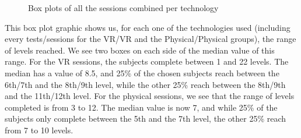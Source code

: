 \documentclass[12pt, openany, twocolumn]{article}
\begin{document}
                \begin{figure}[H]
                    \setlength{\fboxsep}{0pt}
                    \setlength{\fboxrule}{1pt}
                    \caption{Box plots of all the sessions combined per technology}
                \end{figure}

            This box plot graphic shows us, for each one of the technologies used (including every tests/sessions for the VR/VR and the Physical/Physical groups), the range of levels reached. We see two boxes on each side of the median value of this range.
            For the VR sessions, the subjects complete between 1 and 22 levels. The median has a value of 8.5, and 25\% of the chosen subjects reach between the 6th/7th and the 8th/9th level, while the other 25\% reach between the 8th/9th and the 11th/12th level.
            For the physical sessions, we see that the range of levels completed is from 3 to 12. The median value is now 7, and while 25\% of the subjects only complete between the 5th and the 7th level, the other 25\% reach from 7 to 10 levels.
\end{document}
